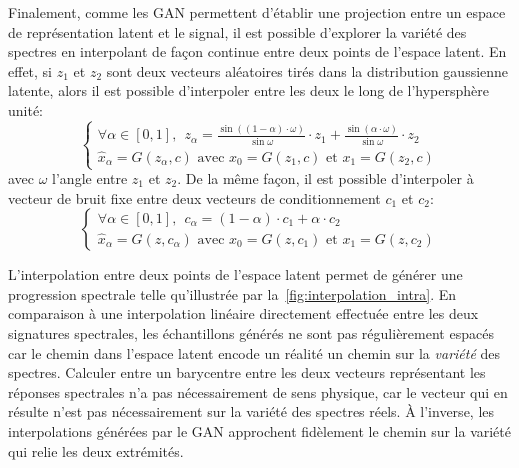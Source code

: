 Finalement, comme les \gls{GAN} permettent d'établir une projection entre un espace de représentation latent et le signal, il est possible d'explorer la variété des spectres en interpolant de façon continue entre deux points de l'espace latent. En effet, si $z_1$ et $z_2$ sont deux vecteurs aléatoires tirés dans la distribution gaussienne latente, alors il est possible d'interpoler entre les deux le long de l'hypersphère unité:
\begin{equation}
	\begin{cases}
		\forall \alpha \in [0,1],~~z_\alpha = \frac{\sin((1 - \alpha)\cdot \omega)}{\sin{\omega}} \cdot z_1 + \frac{\sin(\alpha \cdot \omega)}{\sin{\omega}} \cdot z_2\\
		\hat{x}_\alpha = G(z_\alpha, c) \text{ avec } x_0 = G(z_1, c) \text{ et } x_1 = G(z_2, c)
	\end{cases}
\end{equation}
avec $\omega$ l'angle entre $z_1$ et $z_2$. De la même façon, il est possible d'interpoler à vecteur de bruit fixe entre deux vecteurs de conditionnement $c_1$ et $c_2$:
\begin{equation}
	\begin{cases}
		\forall \alpha \in [0,1],~~c_\alpha = (1-\alpha) \cdot c_1 + \alpha \cdot c_2\\
		\hat{x}_\alpha = G(z, c_\alpha) \text{ avec } x_0 = G(z, c_1) \text{ et } x_1 = G(z, c_2)
	\end{cases}
\end{equation}

L'interpolation entre deux points de l'espace latent permet de générer une progression spectrale telle qu'illustrée par la~\cref{fig:interpolation_intra}. En comparaison à une interpolation linéaire directement effectuée entre les deux signatures spectrales, les échantillons générés ne sont pas régulièrement espacés car le chemin dans l'espace latent encode un réalité un chemin sur la \emph{variété} des spectres. Calculer entre un barycentre entre les deux vecteurs représentant les réponses spectrales n'a pas nécessairement de sens physique, car le vecteur qui en résulte n'est pas nécessairement sur la variété des spectres réels. À l'inverse, les interpolations générées par le \gls{GAN} approchent fidèlement le chemin sur la variété qui relie les deux extrémités.

